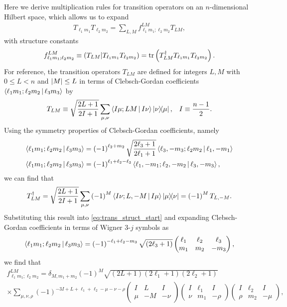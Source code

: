 \documentclass[nofootinbib,notitlepage,11pt]{revtex4-2}
\newcommand{\f}[2]{\dfrac{#1}{#2}} %
\newcommand{\p}[1]{\left(#1\right)} %
\newcommand{\bk}{\Braket} %
\newcommand{\1}{\mathds{1}}
\def\obk#1{\mathinner{({#1})}}
\begin{document}
Here we derive multiplication rules for transition operators on an $n$-dimensional Hilbert space, which allows us to expand
\begin{align}
  T_{\ell_1 m_1} T_{\ell_2 m_2}
  = \sum_{L,M} f_{\ell_1 m_1;\ell_2 m_2}^{LM} T_{LM},
\end{align}
with structure constants
\begin{align}
  f_{\ell_1 m_1;\ell_2 m_2}^{LM}
  \equiv \obk{T_{LM} | T_{\ell_1 m_1} T_{\ell_2 m_2}}
  = \tr\p{T_{LM}^\dag T_{\ell_1 m_1} T_{\ell_2 m_2}}.
  \label{eq:trans_struct_start}
\end{align}
For reference, the transition operators $T_{LM}$ are defined for
integers $L,M$ with $0\le L<n$ and $\abs{M}\le L$ in terms of
Clebsch-Gordan coefficients $\bk{\ell_1 m_1;\ell_2 m_2|\ell_3 m_3}$ by
\begin{align}
  T_{LM} \equiv \sqrt{\f{2L+1}{2I+1}}
  \sum_{\mu,\nu} \bk{I\mu;LM|I\nu} \op{\nu}{\mu},
  &&
  I \equiv \f{n-1}{2}.
\end{align}
Using the symmetry properties of Clebsch-Gordan coefficients, namely
\begin{align}
  \bk{\ell_1 m_1; \ell_2 m_2| \ell_3 m_3}
  &= \p{-1}^{\ell_2+m_2} \sqrt{\f{2\ell_3+1}{2\ell_1+1}}
  \bk{\ell_3,-m_3; \ell_2 m_2| \ell_1,-m_1} \\
  \bk{\ell_1 m_1; \ell_2 m_2| \ell_3 m_3}
  &= \p{-1}^{\ell_1+\ell_2-\ell_3}
  \bk{\ell_1,-m_1; \ell_2,-m_2| \ell_3,-m_3},
\end{align}
we can find that
\begin{align}
  T_{LM}^\dag
  = \sqrt{\f{2L+1}{2I+1}}
  \sum_{\mu,\nu} \p{-1}^M \bk{I\nu;L,-M|I\mu} \op{\mu}{\nu}
  = \p{-1}^M T_{L,-M}.
\end{align}
Substituting this result into \eqref{eq:trans_struct_start} and
expanding Clebsch-Gordan coefficients in terms of Wigner 3-$j$ symbols
as
\begin{align}
  \bk{\ell_1 m_1; \ell_2 m_2| \ell_3 m_3}
  = \p{-1}^{-\ell_1+\ell_2-m_3} \sqrt{\p{2\ell_3+1}}
  \begin{pmatrix}
    \ell_1 & \ell_2 & \ell_3 \\
    m_1 & m_2 & -m_3
  \end{pmatrix},
\end{align}
we find that
\begin{multline}
  f_{\ell_1 m_1;\ell_2 m_2}^{LM}
  = \delta_{M,m_1+m_2}
  \p{-1}^M \sqrt{\p{2L+1}\p{2\ell_1+1}\p{2\ell_2+1}} \\
  \times \sum_{\mu,\nu,\rho} \p{-1}^{-3I+L+\ell_1+\ell_2-\mu-\nu-\rho}
  \begin{pmatrix}
    I & L & I \\
    \mu & -M & -\nu
  \end{pmatrix}
  \begin{pmatrix}
    I & \ell_1 & I \\
    \nu & m_1 & -\rho
  \end{pmatrix}
  \begin{pmatrix}
    I & \ell_2 & I \\
    \rho & m_2 & -\mu
  \end{pmatrix},
\end{multline}
\end{document}
